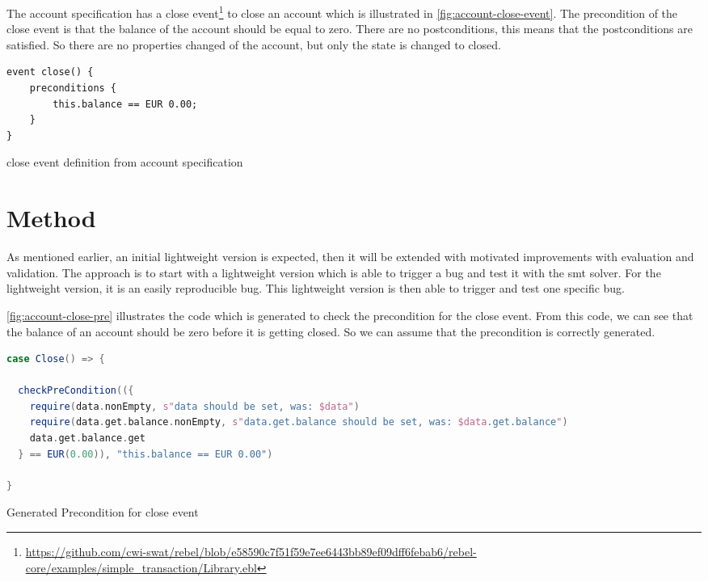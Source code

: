 The account specification has a close event\footnote{\url{https://github.com/cwi-swat/rebel/blob/e58590c7f51f59e7ee6443bb89ef09dff6febab6/rebel-core/examples/simple_transaction/Library.ebl}}
to close an account which is illustrated in \autoref{fig:account-close-event}.
The precondition of the close event is that the balance of the account should be
equal to zero. There are no postconditions, this means that the postconditions
are satisfied. So there are no properties changed of the account, but only the state
is changed to closed.

\begin{sourcecode}[h!]
\begin{lstlisting}[]
event close() {
	preconditions {
		this.balance == EUR 0.00;
	}
}
\end{lstlisting}
\caption{close event definition from account specification}\label{fig:account-close-event}
\end{sourcecode}
\FloatBarrier

\section{Method}

As mentioned earlier, an initial lightweight version is expected, then it will
be extended with motivated improvements with evaluation and validation. The
approach is to start with a lightweight version which is able to trigger a bug
and test it with the \gls{smt} solver. For the lightweight version, it is an easily
reproducible bug. This lightweight version is then able to trigger and test one
specific bug.

\autoref{fig:account-close-pre} illustrates the code which is generated to check
the precondition for the close event. From this code, we can see that the
balance of an account should be zero before it is getting closed. So we can
assume that the precondition is correctly generated.

\begin{sourcecode}[h!]
\begin{lstlisting}[language=scala]
case Close() => {

  checkPreCondition(({
    require(data.nonEmpty, s"data should be set, was: $data")
    require(data.get.balance.nonEmpty, s"data.get.balance should be set, was: $data.get.balance")
    data.get.balance.get
  } == EUR(0.00)), "this.balance == EUR 0.00")

}
\end{lstlisting}
\caption{Generated Precondition for close event}\label{fig:account-close-pre}
\end{sourcecode}
\FloatBarrier

